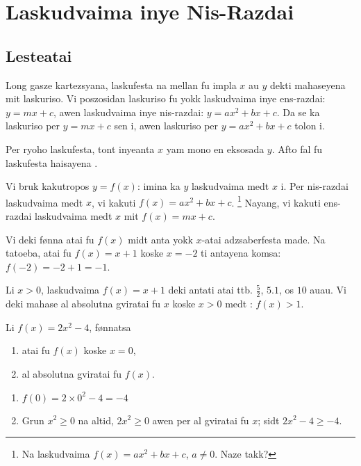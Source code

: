 \chapter{Laskudvaima inye Nis-Razdai}

\section{Lesteatai}

Long gasze kartezsyana, laskufesta na mellan fu impla \(x\) au \(y\) dekti mahaseyena mit laskuriso.
Vi poszosidan laskuriso fu yokk laskudvaima inye ens-razdai: \(y = mx + c\), awen laskudvaima inye
nis-razdai: \(y = ax^2 + bx + c\). Da se ka laskuriso per \(y = mx + c\) sen i, awen laskuriso per
\(y = ax^2 + bx + c\) tolon i.

Per ryoho laskufesta, tont inyeanta \(x\) yam mono en eksosada \(y\).
Afto fal fu laskufesta haisayena .

Vi bruk kakutropos \(y = f\left(x\right)\): imina ka \(y\) laskudvaima medt \(x\) i.
Per nis-razdai laskudvaima medt \(x\), vi kakuti
\(f\left(x\right) = ax^2 + bx + c\). \footnote{Na  laskudvaima \(f\left(x\right)=ax^2+bx+c\), \(a\neq0\). Naze takk?}
Nayang, vi kakuti ens-razdai laskudvaima medt \(x\) mit \(f\left(x\right) = mx + c\).

Vi deki fønna atai fu \(f\left(x\right)\) midt anta yokk \(x\)-atai adzsaberfesta made.
Na tatoeba, atai fu \(f\left(x\right) = x + 1\) koske \(x = -2\) ti antayena komsa: \(f\left(-2\right)=-2+1=-1\).

Li \(x > 0\), laskudvaima \(f\left(x\right) = x + 1\) deki antati atai ttb. \(\frac{5}{2}\), \(5.1\), os \(10\) auau.
Vi deki mahase al absolutna gviratai fu \(x\) koske \(x > 0\) medt : \(f\left(x\right) > 1\).

\begin{tatoeba}
  Li \(f\left(x\right)=2x^2-4\), fønnatsa
  \begin{enumerate}
    \item atai fu \(f\left(x\right)\) koske \(x=0\),
    \item al absolutna gviratai fu \(f\left(x\right)\).
  \end{enumerate}
\end{tatoeba}
\begin{svarna}
  \begin{enumerate}
    \item \(f\left(0\right) = 2\times0^2 - 4 = -4\)
    \item Grun \(x^2\geq0\) na altid, \(2x^2\geq0\) awen per al gviratai fu \(x\); sidt \(2x^2-4\geq-4\).
  \end{enumerate}
\end{svarna}

